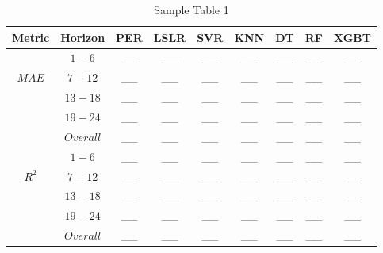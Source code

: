 \begin{table}[h]
\begin{center}
    \caption{Sample Table 1}
    \begin{tabular}{ c c c c c c c c c}
    	\toprule
    	\textbf{Metric} & \textbf{Horizon} & \textbf{PER} & \textbf{LSLR} & \textbf{SVR} & \textbf{KNN} & \textbf{DT} & \textbf{RF} & \textbf{XGBT}\\
    	\midrule
    	\multirow{3}{4em}{$MAE$} & $1 - 6$ & \_\_ & \_\_ & \_\_ & \_\_ & \_\_ & \_\_ & \_\_\\ &
    	$7 - 12$ & \_\_ & \_\_ & \_\_ & \_\_ & \_\_ & \_\_ & \_\_\\ &
    	$13 - 18$ & \_\_ & \_\_ & \_\_ & \_\_ & \_\_ & \_\_ & \_\_\\ &
    	$19 - 24$ & \_\_ & \_\_ & \_\_ & \_\_ & \_\_ & \_\_ & \_\_\\ &
    	$Overall$ & \_\_ & \_\_ & \_\_ & \_\_ & \_\_ & \_\_ & \_\_\\
    	\midrule
    	\multirow{3}{4em}{$R^2$} & $1 - 6$ & \_\_ & \_\_ & \_\_ & \_\_ & \_\_ & \_\_ & \_\_ \\ &
    	$7 - 12$ & \_\_ & \_\_ & \_\_ & \_\_ & \_\_ & \_\_ & \_\_\\ &
    	$13 - 18$ & \_\_ & \_\_ & \_\_ & \_\_ & \_\_ & \_\_ & \_\_\\ &
    	$19 - 24$ & \_\_ & \_\_ & \_\_ & \_\_ & \_\_ & \_\_ & \_\_\\ &
    	$Overall$ & \_\_ & \_\_ & \_\_ & \_\_ & \_\_ & \_\_ & \_\_\\
    	\bottomrule
    \end{tabular}
\end{center}
\end{table}

\newpage